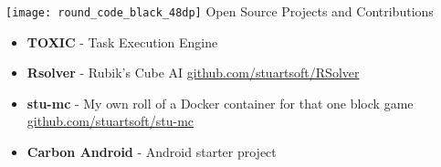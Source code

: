 {\noindent \texttt{[image: round\_code\_black\_48dp]} \hspace{0.25pc} \large Open Source Projects and Contributions}\hspace{1pc}{\noindent\rule{25pc}{0.4pt}}

\begin{itemize}
	\setlength{\itemsep}{0.0pc}
	\item[] \textbf{TOXIC} - Task Execution Engine
	
	\item[] \textbf{Rsolver} - Rubik's Cube AI \hspace{18.5pc} {\secondaryColor \href{https://www.github.com/stuartsoft/RSolver}{github.com/stuartsoft/RSolver}}
	
	\item[] \textbf{stu-mc} - My own roll of a Docker container for that one block game\hspace{3.75pc} {\secondaryColor \href{https://github.com/stuartsoft/stu-mc}{github.com/stuartsoft/stu-mc}}
	
	\item[] \textbf{Carbon Android} - Android starter project\hspace{13.15pc}
	{}		
\end{itemize}
